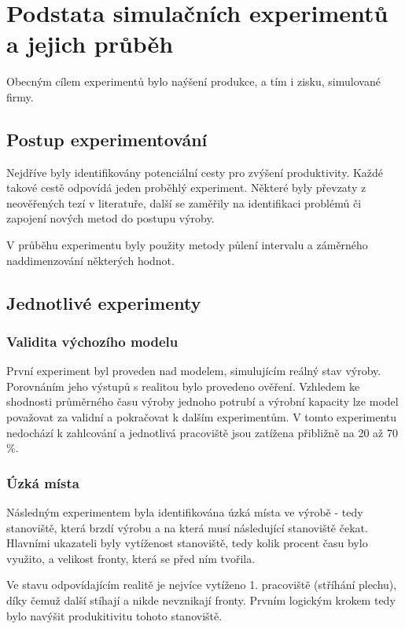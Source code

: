 \documentclass[11pt, a4paper]{article}
\begin{document}
\newpage
\section{Podstata simulačních experimentů a jejich průběh}
Obecným cílem experimentů bylo naýšení produkce, a tím i zisku, simulované firmy.

\subsection{Postup experimentování}
Nejdříve byly identifikovány potenciální cesty pro zvýšení produktivity. Každé takové cestě odpovídá jeden proběhlý experiment. Některé byly převzaty z neověřených tezí v literatuře, další se zaměřily na identifikaci problémů či zapojení nových metod do postupu výroby.

V průběhu experimentu byly použity metody půlení intervalu a záměrného naddimenzování některých hodnot.

\subsection{Jednotlivé experimenty}

\subsubsection{Validita výchozího modelu}
První experiment byl proveden nad modelem, simulujícím reálný stav výroby. Porovnáním jeho výstupů s realitou bylo provedeno ověření. Vzhledem ke shodnosti průměrného času výroby jednoho potrubí a výrobní kapacity lze model považovat za validní a pokračovat k dalším experimentům. V tomto experimentu nedochází k zahlcování a jednotlivá pracoviště jsou zatížena přibližně na 20 až 70 \%.



\subsubsection{Úzká místa}
Následným experimentem byla identifikována úzká místa ve výrobě - tedy stanoviště, která brzdí výrobu a na která musí následující stanoviště čekat. Hlavními ukazateli byly vytíženost stanoviště, tedy kolik procent času bylo využito, a velikost fronty, která se před ním tvořila.

Ve stavu odpovídajícím realitě je nejvíce vytíženo 1. pracoviště (stříhání plechu), díky čemuž další stíhají a nikde nevznikají fronty. Prvním logickým krokem tedy bylo navýšit produkitivitu tohoto stanoviště.
\end{document}
